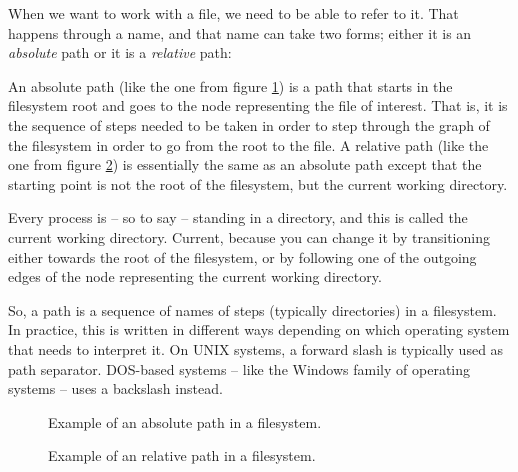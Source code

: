When we want to work with a file, we need to be able to refer to it. That happens through a name, and that name can take two forms; either it is an \textsl{absolute} path or it is a \textsl{relative} path:
\begin{itemize}
   An absolute path (like the one from figure \ref{fig:bs:fs:path:abs}) is a path that starts in the filesystem root and goes to the node representing the file of interest. That is, it is the sequence of steps needed to be taken in order to step through the graph of the filesystem in order to go from the root to the file.
   A relative path (like the one from figure \ref{fig:bs:fs:path:rel}) is essentially the same as an absolute path except that the starting point is not the root of the filesystem, but the current working directory.
  
  Every process is -- so to say -- standing in a directory, and this is called the current working directory. Current, because you can change it by transitioning either towards the root of the filesystem, or by following one of the outgoing edges of the node representing the current working directory.
\end{itemize}

So, a path is a sequence of names of steps (typically directories) in a filesystem. In practice, this is written in different ways depending on which operating system that needs to interpret it. On UNIX systems, a forward slash \say{/} is typically used as path separator. DOS-based systems -- like the Windows family of operating systems -- uses a backslash \say{\textbackslash} instead.

\begin{figure}[tbp]
  
  \caption{Example of an absolute path in a filesystem.}
  \label{fig:bs:fs:path:abs}
\end{figure}

\begin{figure}[tbp]
  
  \caption{Example of an relative path in a filesystem.}
  \label{fig:bs:fs:path:rel}
\end{figure}

